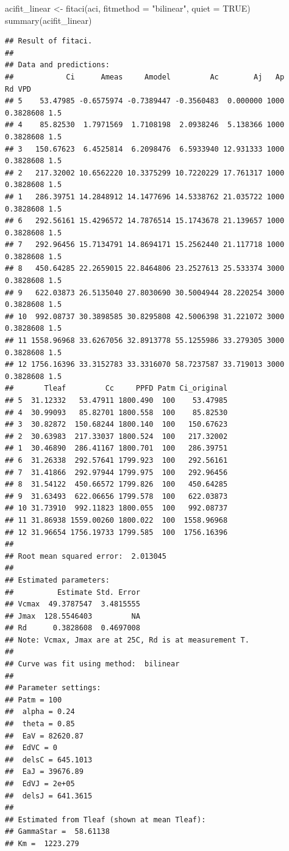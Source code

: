 \documentclass[
]{krantz}
\makeatletter
\newenvironment{Shaded}{\begin{snugshade}}{\end{snugshade}}
\newcommand{\AttributeTok}[1]{\textcolor[rgb]{0.77,0.63,0.00}{#1}}
\newcommand{\ConstantTok}[1]{\textcolor[rgb]{0.00,0.00,0.00}{#1}}
\newcommand{\FunctionTok}[1]{\textcolor[rgb]{0.00,0.00,0.00}{#1}}
\newcommand{\NormalTok}[1]{#1}
\newcommand{\OtherTok}[1]{\textcolor[rgb]{0.56,0.35,0.01}{#1}}
\newcommand{\StringTok}[1]{\textcolor[rgb]{0.31,0.60,0.02}{#1}}
\newenvironment{kframe}{%
\medskip{}
\setlength{\fboxsep}{.8em}
 \def\at@end@of@kframe{}%
 \ifinner\ifhmode%
  \def\at@end@of@kframe{\end{minipage}}%
  \begin{minipage}{\columnwidth}%
 \fi\fi%
 \def\FrameCommand##1{\hskip\@totalleftmargin \hskip-\fboxsep
 \colorbox{shadecolor}{##1}\hskip-\fboxsep
     \hskip-\linewidth \hskip-\@totalleftmargin \hskip\columnwidth}%
 \MakeFramed {\advance\hsize-\width
   \@totalleftmargin\z@ \linewidth\hsize
   \@setminipage}}%
 {\par\unskip\endMakeFramed%
 \at@end@of@kframe}
\renewenvironment{Shaded}{\begin{kframe}}{\end{kframe}}
\makeatother
\begin{document}
\begin{Shaded}
\begin{Highlighting}[]
\NormalTok{acifit\_linear }\OtherTok{\textless{}{-}} \FunctionTok{fitaci}\NormalTok{(aci,  }\AttributeTok{fitmethod =} \StringTok{"bilinear"}\NormalTok{, }\AttributeTok{quiet =} \ConstantTok{TRUE}\NormalTok{)}
\FunctionTok{summary}\NormalTok{(acifit\_linear)}
\end{Highlighting}
\end{Shaded}

\begin{verbatim}
## Result of fitaci.
## 
## Data and predictions:
##            Ci      Ameas     Amodel         Ac        Aj   Ap        Rd VPD
## 5    53.47985 -0.6575974 -0.7389447 -0.3560483  0.000000 1000 0.3828608 1.5
## 4    85.82530  1.7971569  1.7108198  2.0938246  5.138366 1000 0.3828608 1.5
## 3   150.67623  6.4525814  6.2098476  6.5933940 12.931333 1000 0.3828608 1.5
## 2   217.32002 10.6562220 10.3375299 10.7220229 17.761317 1000 0.3828608 1.5
## 1   286.39751 14.2848912 14.1477696 14.5338762 21.035722 1000 0.3828608 1.5
## 6   292.56161 15.4296572 14.7876514 15.1743678 21.139657 1000 0.3828608 1.5
## 7   292.96456 15.7134791 14.8694171 15.2562440 21.117718 1000 0.3828608 1.5
## 8   450.64285 22.2659015 22.8464806 23.2527613 25.533374 3000 0.3828608 1.5
## 9   622.03873 26.5135040 27.8030690 30.5004944 28.220254 3000 0.3828608 1.5
## 10  992.08737 30.3898585 30.8295808 42.5006398 31.221072 3000 0.3828608 1.5
## 11 1558.96968 33.6267056 32.8913778 55.1255986 33.279305 3000 0.3828608 1.5
## 12 1756.16396 33.3152783 33.3316070 58.7237587 33.719013 3000 0.3828608 1.5
##       Tleaf         Cc     PPFD Patm Ci_original
## 5  31.12332   53.47911 1800.490  100    53.47985
## 4  30.99093   85.82701 1800.558  100    85.82530
## 3  30.82872  150.68244 1800.140  100   150.67623
## 2  30.63983  217.33037 1800.524  100   217.32002
## 1  30.46890  286.41167 1800.701  100   286.39751
## 6  31.26338  292.57641 1799.923  100   292.56161
## 7  31.41866  292.97944 1799.975  100   292.96456
## 8  31.54122  450.66572 1799.826  100   450.64285
## 9  31.63493  622.06656 1799.578  100   622.03873
## 10 31.73910  992.11823 1800.055  100   992.08737
## 11 31.86938 1559.00260 1800.022  100  1558.96968
## 12 31.96654 1756.19733 1799.585  100  1756.16396
## 
## Root mean squared error:  2.013045 
## 
## Estimated parameters:
##          Estimate Std. Error
## Vcmax  49.3787547  3.4815555
## Jmax  128.5546403         NA
## Rd      0.3828608  0.4697008
## Note: Vcmax, Jmax are at 25C, Rd is at measurement T.
## 
## Curve was fit using method:  bilinear 
## 
## Parameter settings:
## Patm = 100
##  alpha = 0.24
##  theta = 0.85
##  EaV = 82620.87
##  EdVC = 0
##  delsC = 645.1013
##  EaJ = 39676.89
##  EdVJ = 2e+05
##  delsJ = 641.3615
## 
## Estimated from Tleaf (shown at mean Tleaf):
## GammaStar =  58.61138 
## Km =  1223.279
\end{verbatim}
\end{document}
